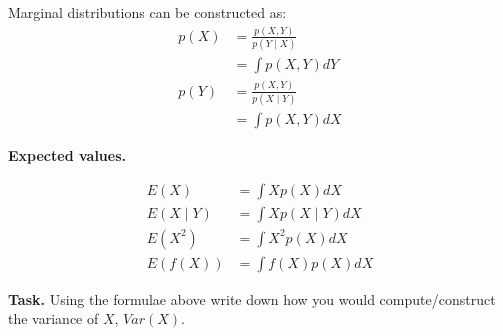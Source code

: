 \documentclass[10pt]{article}
\begin{document}
\smallskip\noindent Marginal distributions can be constructed as:
\begin{align*}
p(X) & = \frac{p(X, Y)}{p(Y\mid X)}\\
&= \int p(X,Y)dY\\
p(Y) & = \frac{p(X, Y)}{p(X\mid Y)}\\
&= \int p(X,Y)dX
\end{align*}

\bigskip\noindent\textbf{\large Expected values.} 

\smallskip\noindent 
\begin{align*}
E(X) & = \int Xp(X)dX\\
E(X\mid Y) & = \int Xp(X\mid Y)dX\\
E\left(X^2\right) & = \int X^2p(X)dX\\
E(f(X)) & = \int f(X)p(X)dX
\end{align*}

\smallskip\noindent\textbf{Task.} Using the formulae above write down how you would compute/construct the variance of $X$, $Var(X)$.
\end{document}
